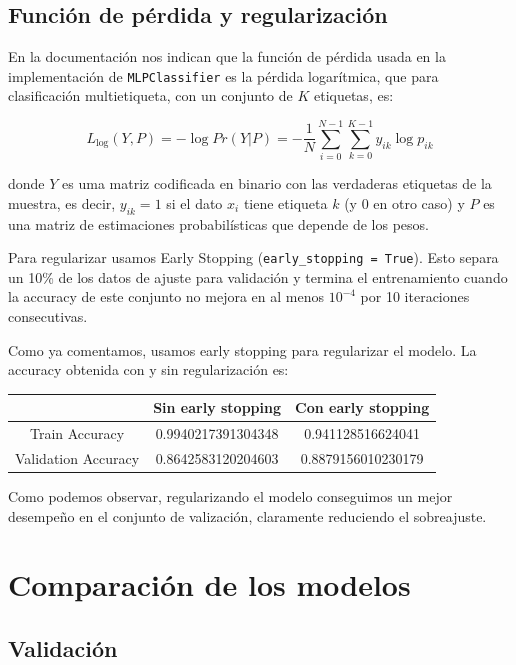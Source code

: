\documentclass[a4]{article}
\begin{document}
\subsection{Función de pérdida y regularización}

En la documentación nos indican que la función de pérdida usada en la
implementación de \texttt{MLPClassifier} es la pérdida logarítmica,
que para clasificación multietiqueta, con un conjunto de $K$
etiquetas, es:

\[ L_{\log}(Y,P) = -\log Pr(Y|P) = -\frac{1}{N}\sum\limits_{i=0}^{N-1}\sum\limits_{k=0}^{K-1} y_{ik}\log p_{ik}\]

donde $Y$ es uma matriz codificada en binario con las verdaderas
etiquetas de la muestra, es decir, $y_{ik} = 1$ si el dato $x_i$ tiene
etiqueta $k$ (y $0$ en otro caso) y $P$ es una matriz de estimaciones
probabilísticas que depende de los pesos.

Para regularizar usamos Early Stopping (\texttt{early\_stopping =
  True}). Esto separa un 10\% de los datos de ajuste para validación y
termina el entrenamiento cuando la accuracy de este conjunto no mejora
en al menos $10^{-4}$ por 10 iteraciones consecutivas.

Como ya comentamos, usamos early stopping para regularizar el modelo. La accuracy obtenida con y sin regularización es:

\begin{center}
\begin{tabular}{|c|c|c|}
  \hline
  \multicolumn{1}{|c|}{}& \textbf{Sin early stopping} &
                                                                       \textbf{Con early stopping}  \\ \hline
  Train Accuracy      & 0.9940217391304348 & 0.941128516624041 \\
  Validation Accuracy & 0.8642583120204603 &  0.8879156010230179 \\ \hline
\end{tabular}
\end{center}

Como podemos observar, regularizando el modelo conseguimos un mejor desempeño en el conjunto de valización, claramente reduciendo el sobreajuste.

\section{Comparación de los modelos}

\subsection{Validación}
\end{document}

